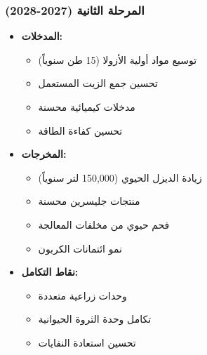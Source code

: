 \subsubsection{المرحلة الثانية (2027-2028)}
\begin{itemize}
    \item \textbf{المدخلات:}
    \begin{itemize}
        \item توسيع مواد أولية الأزولا (15 طن سنوياً)
        \item تحسين جمع الزيت المستعمل
        \item مدخلات كيميائية محسنة
        \item تحسين كفاءة الطاقة
    \end{itemize}
    \item \textbf{المخرجات:}
    \begin{itemize}
        \item زيادة الديزل الحيوي (150,000 لتر سنوياً)
        \item منتجات جليسرين محسنة
        \item فحم حيوي من مخلفات المعالجة
        \item نمو ائتمانات الكربون
    \end{itemize}
    \item \textbf{نقاط التكامل:}
    \begin{itemize}
        \item وحدات زراعية متعددة
        \item تكامل وحدة الثروة الحيوانية
        \item تحسين استعادة النفايات
    \end{itemize}
\end{itemize}

